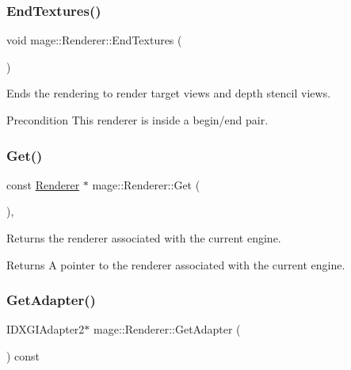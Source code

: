 \subsubsection{\texorpdfstring{End\+Textures()}{EndTextures()}}
{\footnotesize\ttfamily void mage\+::\+Renderer\+::\+End\+Textures (\begin{DoxyParamCaption}{ }\end{DoxyParamCaption})}

Ends the rendering to render target views and depth stencil views.

\begin{DoxyPrecond}{Precondition}
This renderer is inside a begin/end pair. 
\end{DoxyPrecond}
\hypertarget{classmage_1_1_renderer_a84ad465ae4ecfa2c0e9334cadb82d269}{}\label{classmage_1_1_renderer_a84ad465ae4ecfa2c0e9334cadb82d269} 
\subsubsection{\texorpdfstring{Get()}{Get()}}
{\footnotesize\ttfamily const \hyperlink{classmage_1_1_renderer}{Renderer} $\ast$ mage\+::\+Renderer\+::\+Get (\begin{DoxyParamCaption}{ }\end{DoxyParamCaption})\hspace{0.3cm}{\ttfamily [static]}, {\ttfamily [noexcept]}}

Returns the renderer associated with the current engine.

\begin{DoxyReturn}{Returns}
A pointer to the renderer associated with the current engine. 
\end{DoxyReturn}
\hypertarget{classmage_1_1_renderer_a75fe0cdffda2e282dba1081dfddaa94d}{}\label{classmage_1_1_renderer_a75fe0cdffda2e282dba1081dfddaa94d} 
\subsubsection{\texorpdfstring{Get\+Adapter()}{GetAdapter()}}
{\footnotesize\ttfamily I\+D\+X\+G\+I\+Adapter2$\ast$ mage\+::\+Renderer\+::\+Get\+Adapter (\begin{DoxyParamCaption}{ }\end{DoxyParamCaption}) const\hspace{0.3cm}{\ttfamily [noexcept]}}

